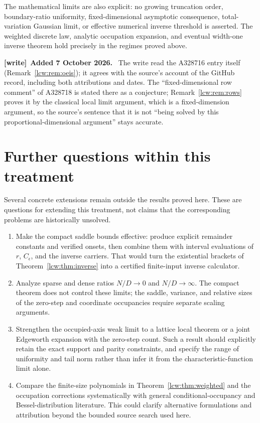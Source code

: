 \documentclass[11pt,letterpaper]{article}
\theoremstyle{remark}\newtheorem{remark}[theorem]{Remark}
\newenvironment{writenote}[1][]{\par\smallskip\begingroup\small
 \noindent\textbf{[write]}\if\relax\detokenize{#1}\relax\else~\textbf{#1.}\fi\ }%
 {\par\endgroup\smallskip}
\begin{document}
The mathematical limits are also explicit: no growing truncation order, boundary-ratio uniformity, fixed-dimensional asymptotic consequence, total-variation Gaussian limit, or effective numerical inverse threshold is asserted. The weighted discrete law, analytic occupation expansion, and eventual width-one inverse theorem hold precisely in the regimes proved above.

\begin{writenote}[Added 7 October 2026]
The write read the A328716 entry itself (Remark~\ref{lcw:rem:oeis}); it
agrees with the source's account of the GitHub record, including both
attributions and dates. The ``fixed-dimensional row comment'' of A328718 is
stated there as a conjecture; Remark~\ref{lcw:rem:rows} proves it by the
classical local limit argument, which is a fixed-dimension argument, so the
source's sentence that it is not ``being solved by this
proportional-dimensional argument'' stays accurate.
\end{writenote}

\section{Further questions within this treatment}\label{lcw:sec:further}
Several concrete extensions remain outside the results proved here. These are questions for extending this treatment, not claims that the corresponding problems are historically unsolved.
\begin{enumerate}
\item Make the compact saddle bounds effective: produce explicit remainder constants and verified onsets, then combine them with interval evaluations of $r$, $C_\epsilon$, and the inverse carriers. That would turn the existential brackets of Theorem~\ref{lcw:thm:inverse} into a certified finite-input inverse calculator.
\item Analyze sparse and dense ratios $N/D\to0$ and $N/D\to\infty$. The compact theorem does not control these limits; the saddle, variance, and relative sizes of the zero-step and coordinate occupancies require separate scaling arguments.
\item Strengthen the occupied-axis weak limit to a lattice local theorem or a joint Edgeworth expansion with the zero-step count. Such a result should explicitly retain the exact support and parity constraints, and specify the range of uniformity and tail norm rather than infer it from the characteristic-function limit alone.
\item Compare the finite-size polynomials in Theorem~\ref{lcw:thm:weighted} and the occupation corrections systematically with general conditional-occupancy and Bessel-distribution literature. This could clarify alternative formulations and attribution beyond the bounded source search used here.
\end{enumerate}
\end{document}
